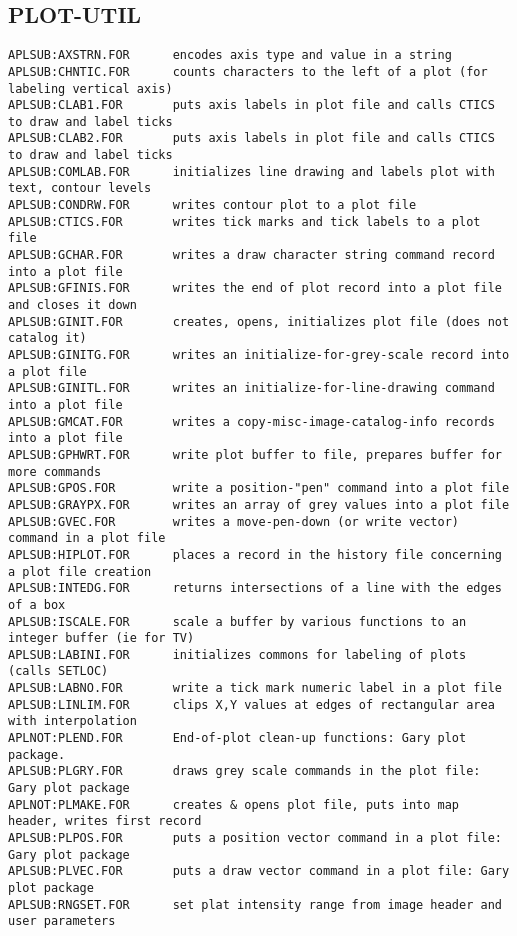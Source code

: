 \subsection{PLOT-UTIL}
\begin{verbatim}
APLSUB:AXSTRN.FOR      encodes axis type and value in a string
APLSUB:CHNTIC.FOR      counts characters to the left of a plot (for labeling vertical axis)
APLSUB:CLAB1.FOR       puts axis labels in plot file and calls CTICS to draw and label ticks
APLSUB:CLAB2.FOR       puts axis labels in plot file and calls CTICS to draw and label ticks
APLSUB:COMLAB.FOR      initializes line drawing and labels plot with text, contour levels
APLSUB:CONDRW.FOR      writes contour plot to a plot file
APLSUB:CTICS.FOR       writes tick marks and tick labels to a plot file
APLSUB:GCHAR.FOR       writes a draw character string command record into a plot file
APLSUB:GFINIS.FOR      writes the end of plot record into a plot file and closes it down
APLSUB:GINIT.FOR       creates, opens, initializes plot file (does not catalog it)
APLSUB:GINITG.FOR      writes an initialize-for-grey-scale record into a plot file
APLSUB:GINITL.FOR      writes an initialize-for-line-drawing command into a plot file
APLSUB:GMCAT.FOR       writes a copy-misc-image-catalog-info records into a plot file
APLSUB:GPHWRT.FOR      write plot buffer to file, prepares buffer for more commands
APLSUB:GPOS.FOR        write a position-"pen" command into a plot file
APLSUB:GRAYPX.FOR      writes an array of grey values into a plot file
APLSUB:GVEC.FOR        writes a move-pen-down (or write vector) command in a plot file
APLSUB:HIPLOT.FOR      places a record in the history file concerning a plot file creation
APLSUB:INTEDG.FOR      returns intersections of a line with the edges of a box
APLSUB:ISCALE.FOR      scale a buffer by various functions to an integer buffer (ie for TV)
APLSUB:LABINI.FOR      initializes commons for labeling of plots (calls SETLOC)
APLSUB:LABNO.FOR       write a tick mark numeric label in a plot file
APLSUB:LINLIM.FOR      clips X,Y values at edges of rectangular area with interpolation
APLNOT:PLEND.FOR       End-of-plot clean-up functions: Gary plot package.
APLSUB:PLGRY.FOR       draws grey scale commands in the plot file: Gary plot package
APLNOT:PLMAKE.FOR      creates & opens plot file, puts into map header, writes first record
APLSUB:PLPOS.FOR       puts a position vector command in a plot file: Gary plot package
APLSUB:PLVEC.FOR       puts a draw vector command in a plot file: Gary plot package
APLSUB:RNGSET.FOR      set plat intensity range from image header and user parameters

\end{verbatim}

